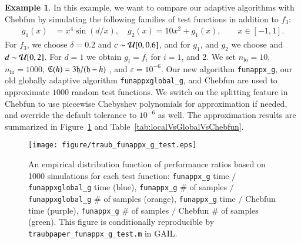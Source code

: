 \documentclass[review]{elsarticle}
\newcommand{\abstol}{\varepsilon}
\theoremstyle{definition}
\newtheorem{exmp}{Example}
\newcommand{\funappxg}{\texttt{funappx\_g}\xspace}
\newcommand{\funappxglobalg}{\texttt{funappxglobal\_g}\xspace}
\begin{document}

\begin{exmp}
In this example, we want to compare our adaptive algorithms with Chebfun by
simulating the following families of test functions  in addition to $f_3$:
%
\begin{align*}
 g_1(x) &= x^4 \sin(d/x), \quad
 g_2(x) = 10  x^2 + g_1(x), \qquad x \in [-1, 1].
\end{align*}
For $f_3$, we choose $\delta = 0.2$ and $c \sim \mathcal{U}[0,0.6]$, and for $g_1$, and
$g_2$ we choose and $d \sim \mathcal{U}[0,2]$. For $d=1$ we obtain $g_i = f_i$ for
$i=1$, and $2$. We set $n_{\text{lo}} = 10$, $n_{\text{hi}} = 1000$, $\mathfrak{C} (h) =
3 \mathfrak{h}/(\mathfrak{h}-h)$ , and $\abstol = 10^{-6}$. Our new algorithm \texttt{funappx\_g},
our old globally adaptive algorithm \texttt{funappxglobal\_g}, and Chebfun are
used to approximate $1000$ random test functions. We switch on the splitting
feature in Chebfun to use piecewise Chebyshev polynomials for approximation if
needed, and override the default tolerance to $10^{-6}$ as well. The
approximation results are summarized in Figure~\ref{fig:testfunctions} and
Table~\ref{tab:localVsGlobalVsChebfun}.

%
\begin{figure}[tb]
  \centering
\texttt{[image: figure/traub\_funappx\_g\_test.eps]}
\caption{An empirical distribution function of performance ratios based on 1000
simulations for each test function: \funappxg{} time $/$ \funappxglobalg{} time
(blue), \funappxg{} \# of samples $/$ \funappxglobalg{} \# of samples (orange),
\funappxg{} time $/$ Chebfun time (purple), \funappxg{} \# of samples $/$
Chebfun \# of samples (green). This figure is conditionally reproducible by
\texttt{traubpaper\_funappx\_g\_test.m} in GAIL.}
\label{fig:testfunctions}
\end{figure}


\end{exmp}
\end{document}

